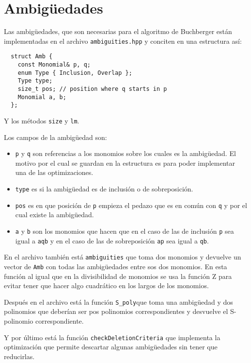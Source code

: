 \documentclass{report}
\theoremstyle{customstyle}
\theoremstyle{factstyle}
\begin{document}
\section{Ambigüedades}

Las ambigüedades, que son necesarias para el algoritmo de Buchberger están implementadas en el archivo \texttt{ambiguities.hpp} y conciten en una estructura así:

\begin{verbatim}
  struct Amb {
    const Monomial& p, q;
    enum Type { Inclusion, Overlap };
    Type type;
    size_t pos; // position where q starts in p
    Monomial a, b;
  };
\end{verbatim}

Y los métodos \texttt{size} y \texttt{lm}.

Los campos de la ambigüedad son:

\begin{itemize}
  \item \texttt{p} y \texttt{q} son referencias a los monomios sobre los cuales es la ambigüedad. El motivo por el cual se guardan en la estructura es para poder implementar una de las optimizaciones.
  \item \texttt{type} es si la ambigüedad es de inclusión o de sobreposición.
  \item \texttt{pos} es en que posición de \texttt{p} empieza el pedazo que es en común con \texttt{q} y por el cual existe la ambigüedad.
  \item \texttt{a} y \texttt{b} son los monomios que hacen que en el caso de las de inclusión \texttt{p} sea igual a \texttt{aqb} y en el caso de las de sobreposición \texttt{ap} sea igual a \texttt{qb}.
\end{itemize}

En el archivo también está \texttt{ambiguities} que toma dos monomios y devuelve un vector de \texttt{Amb} con todas las ambigüedades entre sos dos monomios. En esta función al igual que en la divisibilidad de monomios se usa la función Z para evitar tener que hacer algo cuadrático en los largos de los monomios.

Después en el archivo está la función \texttt{S\_poly}que toma una ambigüedad y dos polinomios que deberían ser pos polinomios correspondientes y desvuelve el S-polinomio correspondiente.

Y por último está la función \texttt{checkDeletionCriteria} que implementa la optimización que permite descartar algunas ambigüedades sin tener que reducirlas.
\end{document}
